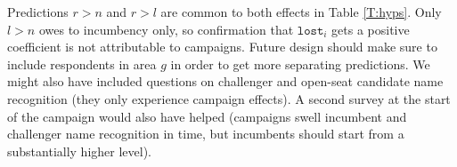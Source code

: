 \documentclass[letter,12pt]{article}
\newcommand{\mc}{\multicolumn}
\begin{document}
Predictions $r>n$ and $r>l$ are common to both effects in Table \ref{T:hyps}. Only $l>n$ owes to incumbency only, so confirmation that $\texttt{lost}_i$ gets a positive coefficient is not attributable to campaigns. Future design should make sure to include respondents in area $g$ in order to get more separating predictions. We might also have included questions on challenger and open-seat candidate name recognition (they only experience campaign effects). A second survey at the start of the campaign would also have helped (campaigns swell incumbent and challenger name recognition in time, but incumbents should start from a substantially higher level).

\end{document}
